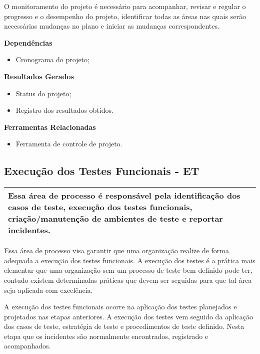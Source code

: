 O monitoramento do projeto é necessário para acompanhar, revisar e regular o progresso e o desempenho do projeto, identificar todas as áreas nas quais serão necessárias mudanças no plano e iniciar as mudanças correspondentes.

\textbf{Dependências}
\begin{itemize}
    \item Cronograma do projeto;
\end{itemize}

\textbf{Resultados Gerados}
\begin{itemize}
    \item  Status do projeto;
    \item  Registro dos resultados obtidos.
\end{itemize}

\textbf{Ferramentas Relacionadas}
\begin{itemize}
    \item Ferramenta de controle de projeto.
\end{itemize}

\subsection{Execução dos Testes Funcionais - ET}
\label{sec:et0}

\begin{table}[!ht]
\centering
\begin{tabular}{|p{130mm}|}
\hline
Essa área de processo é responsável pela identificação dos casos de teste, execução dos testes funcionais, criação/manutenção de ambientes de teste e reportar incidentes. \\ 
\hline
\end{tabular}
\end{table}

Essa área de processo visa garantir que uma organização realize de forma adequada a execução dos testes funcionais. A execução dos testes é a prática mais elementar que uma organização sem um processo de teste bem definido pode ter, contudo existem determinadas práticas que devem ser seguidas para que tal área seja aplicada com excelência.

A execução dos testes funcionais ocorre na aplicação dos testes planejados e projetados nas etapas anteriores. A execução dos testes vem seguido da aplicação dos casos de teste, estratégia de teste e procedimentos de teste definido. Nesta etapa que os incidentes são normalmente encontrados, registrado e acompanhados.

